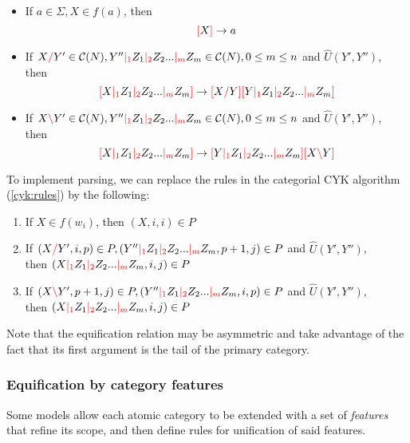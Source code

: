\documentclass[main.tex]{subfiles}
\begin{document}
\begin{itemize}
    \item If $ a \in \Sigma, X \in f(a) $, then \[ \textcolor{red}{[} X \textcolor{red}{]} \rightarrow a \]
    \item If $ X \textcolor{red}{/} Y' \in \mathcal{C}( N ), Y'' \textcolor{red}{|_{1}} Z_1 \textcolor{red}{|_{2}} Z_2 ... \textcolor{red}{|_{m}} Z_m \in \mathcal{C}( N ), 0 \leq m \leq n $
        and $\hat{U}(Y', Y'')$, \\
        then \[ \textcolor{red}{[} X \textcolor{red}{|_{1}} Z_1 \textcolor{red}{|_{2}} Z_2 ... \textcolor{red}{|_{m}} Z_m \textcolor{red}{]} \rightarrow \textcolor{red}{[} X \textcolor{red}{/} Y \textcolor{red}{]} \textcolor{red}{[} Y \textcolor{red}{|_{1}} Z_1 \textcolor{red}{|_{2}} Z_2 ... \textcolor{red}{|_{m}} Z_m \textcolor{red}{]} \]
    \item If $ X \textcolor{red}{\backslash} Y' \in \mathcal{C}( N ), Y'' \textcolor{red}{|_{1}} Z_1 \textcolor{red}{|_{2}} Z_2 ... \textcolor{red}{|_{m}} Z_m \in \mathcal{C}( N ), 0 \leq m \leq n $
        and $\hat{U}(Y', Y'')$, \\
        then \[ \textcolor{red}{[} X \textcolor{red}{|_{1}} Z_1 \textcolor{red}{|_{2}} Z_2 ... \textcolor{red}{|_{m}} Z_m \textcolor{red}{]} \rightarrow \textcolor{red}{[} Y \textcolor{red}{|_{1}} Z_1 \textcolor{red}{|_{2}} Z_2 ... \textcolor{red}{|_{m}} Z_m \textcolor{red}{]} \textcolor{red}{[} X \textcolor{red}{\backslash} Y \textcolor{red}{]} \]
\end{itemize}

To implement parsing, we can replace the rules in the categorial CYK algorithm 
(\cref{cyk:rules}) by the following:

\begin{enumerate}
    \item If $X \in f(w_i)$, then $(X, i, i) \in P$
    \item If $(X \textcolor{red}{/} Y', i, p) \in P, (Y'' \textcolor{red}{|_{1}} Z_1 \textcolor{red}{|_{2}} Z_2 ... \textcolor{red}{|_{m}} Z_m, p + 1, j) \in P$
        and $\hat{U}(Y', Y'')$, \\
        then $(X \textcolor{red}{|_{1}} Z_1 \textcolor{red}{|_{2}} Z_2 ... \textcolor{red}{|_{m}} Z_m, i, j) \in P$
    \item If $(X \textcolor{red}{\backslash} Y', p + 1, j) \in P, (Y'' \textcolor{red}{|_{1}} Z_1 \textcolor{red}{|_{2}} Z_2 ... \textcolor{red}{|_{m}} Z_m, i, p) \in P$
        and $\hat{U}(Y', Y'')$, \\
        then $(X \textcolor{red}{|_{1}} Z_1 \textcolor{red}{|_{2}} Z_2 ... \textcolor{red}{|_{m}} Z_m, i, j) \in P$
\end{enumerate}

Note that the equification relation may be asymmetric and take advantage of the fact
that its first argument is the tail of the primary category.

\subsubsection{Equification by category features}
Some models allow each atomic category to be extended with a set of \emph{features}
that refine its scope, and then define rules for unification of said features.
\end{document}
